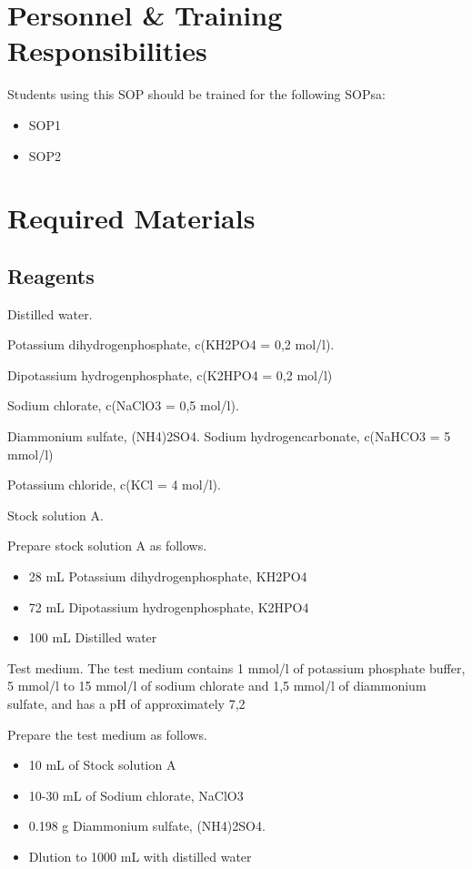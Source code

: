 \documentclass[12pt]{SOP5_beta}\usepackage[]{graphicx}\usepackage[]{xcolor}
\begin{document}
\NP \lipsum[2]


\section{Personnel \& Training Responsibilities}

\NP \lipsum[1]

Students using this SOP should be trained for the following SOPsa:

\begin{itemize}
  \item SOP1
  \item SOP2
\end{itemize}


\section{Required Materials}

\subsection{Reagents}

\NP Distilled water. 

\NP Potassium dihydrogenphosphate, c(KH2PO4 = 0,2 mol/l). 

\NP Dipotassium hydrogenphosphate, c(K2HPO4 = 0,2 mol/l)

\NP Sodium chlorate, c(NaClO3 = 0,5 mol/l). 

\NP Diammonium sulfate, (NH4)2SO4. Sodium hydrogencarbonate, c(NaHCO3 = 5 mmol/l)

\NP Potassium chloride, c(KCl = 4 mol/l). 

Stock solution A. 

\NP Prepare stock solution A as follows. 
  \begin{itemize}
    \item 28 mL Potassium dihydrogenphosphate, KH2PO4
    \item 72 mL Dipotassium hydrogenphosphate, K2HPO4 
    \item 100 mL Distilled water
  \end{itemize}  

\NP Test medium. The test medium contains 1 mmol/l of potassium phosphate buffer, 5 mmol/l to 15 mmol/l of sodium chlorate and 1,5 mmol/l of diammonium sulfate, and has a pH of approximately 7,2 

\NP Prepare the test medium as follows. 

\begin{itemize}
  \item 10 mL of Stock solution A
  \item 10-30 mL of Sodium chlorate, NaClO3 
  \item 0.198 g Diammonium sulfate, (NH4)2SO4.
  \item Dlution to 1000 mL with distilled water
\end{itemize}
\end{document}
